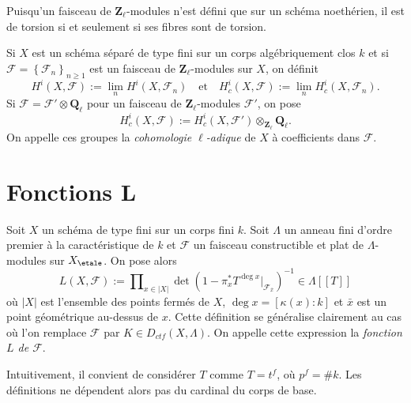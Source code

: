 \begin{remark}
\label{remark-torsion-stalks}
Puisqu'un faisceau de $\mathbf{Z}_\ell$-modules n'est défini que sur un schéma noethérien, il est
de torsion si et seulement si ses fibres sont de torsion.
\end{remark}

\begin{definition}
\label{definition-cohomology-l-adic}
Si $X$ est un schéma séparé de type fini sur un corps algébriquement clos
$k$ et si $\mathcal{F} = \left\{\mathcal{F}_n\right\}_{n\geq 1}$ est un
faisceau de $\mathbf{Z}_\ell$-modules sur $X$, on définit
$$
H^i(X, \mathcal{F}) := \lim_n H^i(X, \mathcal{F}_n)
\quad\text{et}\quad
H_c^i(X, \mathcal{F}) := \lim_n H_c^i(X, \mathcal{F}_n).
$$
Si $\mathcal{F} = \mathcal{F}'\otimes \mathbf{Q}_\ell$ pour un
faisceau de $\mathbf{Z}_\ell$-modules $\mathcal{F}'$, on pose
$$
H_c^i(X , \mathcal{F}) := H_c^i(X,
\mathcal{F}')\otimes_{\mathbf{Z}_\ell}\mathbf{Q}_\ell.
$$
On appelle ces groupes la {\it cohomologie $\ell$-adique} de $X$ à coefficients dans
$\mathcal{F}$.
\end{definition}





\section{Fonctions L}
\label{section-L-function}

\begin{definition}
\label{definition-L-function-finite-ring}
Soit $X$ un schéma de type fini sur un corps fini $k$. Soit $\Lambda$ un
anneau fini d'ordre premier à la caractéristique de $k$ et $\mathcal{F}$ un
faisceau constructible et plat de $\Lambda$-modules sur $X_\etale$. On pose alors
$$
L(X, \mathcal{F}) :=
\prod\nolimits_{x\in |X|}
\det(1 - \pi_x^*T^{\deg x} |_{\mathcal{F}_{\bar x}})^{-1} \in \Lambda [[ T ]]
$$
où $|X|$ est l'ensemble des points fermés de $X$, $\deg x = [\kappa(x): k]$ et
$\bar x$ est un point géométrique au-dessus de $x$. Cette définition se
généralise clairement au cas où l'on remplace $\mathcal{F}$ par
$K \in D_{ctf}(X, \Lambda)$. On appelle cette expression la {\it fonction $L$ de
$\mathcal{F}$}.
\end{definition}

\begin{remark}
\label{remark-T}
Intuitivement, il convient de considérer $T$ comme $T = t^f$, où $p^f = \# k$. Les
définitions ne dépendent alors pas du cardinal du corps de base.
\end{remark}

